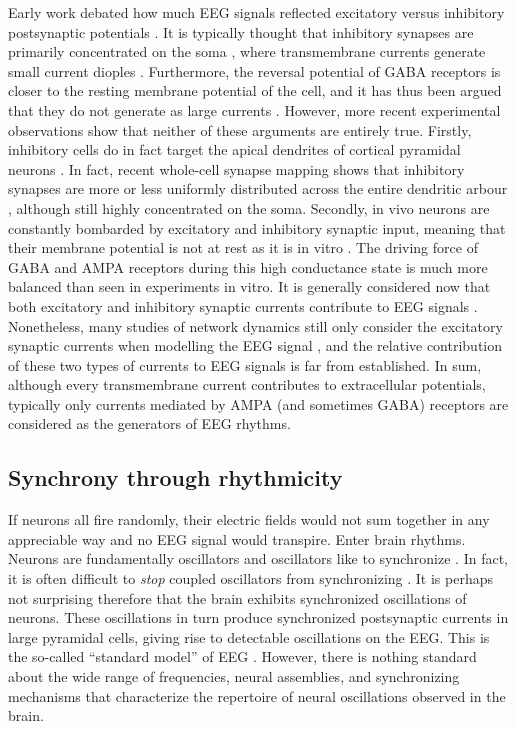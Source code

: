 Early work debated how much EEG signals reflected excitatory versus inhibitory postsynaptic potentials \cite{Pollen1964,Creutzfeldt1966, Creutzfeldt1966a}. It is typically thought that inhibitory synapses are primarily concentrated on the soma \cite{Telenczuk2020, Mazzoni2015,Næss2021}, where transmembrane currents generate small current dioples \cite{Ahlfors2015}. Furthermore, the reversal potential of GABA receptors is closer to the resting membrane potential of the cell, and it has thus been argued that they do not generate as large currents \cite{Buzsaki2012}. However, more recent experimental observations show that neither of these arguments are entirely true. Firstly, inhibitory cells do in fact target the apical dendrites of cortical pyramidal neurons \cite{Palmer2012}. In fact, recent whole-cell synapse mapping shows that inhibitory synapses are more or less uniformly distributed across the entire dendritic arbour \cite{Iacaruso2017}, although still highly concentrated on the soma. Secondly, in vivo neurons are constantly bombarded by excitatory and inhibitory synaptic input, meaning that their membrane potential is not at rest as it is in vitro \cite{Destexhe2003}. The driving force of GABA and AMPA receptors during this high conductance state is much more balanced than seen in experiments in vitro. It is generally considered now that both excitatory and inhibitory synaptic currents contribute to EEG signals \cite{Buzsaki2012}. Nonetheless, many studies of network dynamics still only consider the excitatory synaptic currents when modelling the EEG signal \cite{Jensen2005,McCarthy2008}, and the relative contribution of these two types of currents to EEG signals is far from established. In sum, although every transmembrane current contributes to extracellular potentials, typically only currents mediated by AMPA (and sometimes GABA) receptors are considered as the generators of EEG rhythms.

\subsection{Synchrony through rhythmicity}  \label{sec:delta}
If neurons all fire randomly, their electric fields would not sum together in any appreciable way and no EEG signal would transpire. Enter brain rhythms. Neurons are fundamentally oscillators \cite{HODGKIN1952} and oscillators like to synchronize \cite{Strogatz2015}. In fact, it is often difficult to \textit{stop} coupled oscillators from synchronizing \cite{Erb1992}. It is perhaps not surprising therefore that the brain exhibits synchronized oscillations of neurons. These oscillations in turn produce synchronized postsynaptic currents in large pyramidal cells, giving rise to detectable oscillations on the EEG. This is the so-called ``standard model'' of EEG \cite{Cohen2017}. However, there is nothing standard about the wide range of frequencies, neural assemblies, and synchronizing mechanisms that characterize the repertoire of neural oscillations observed in the brain.

